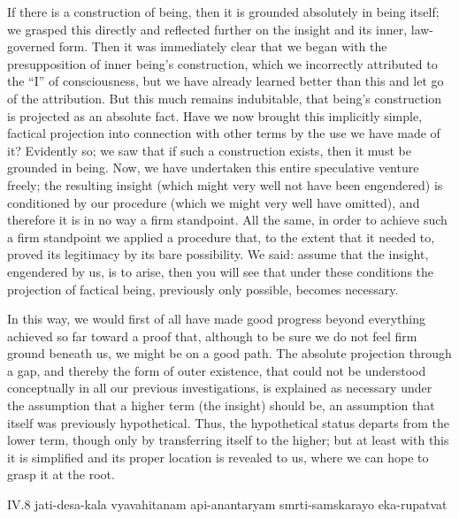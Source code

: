 If there is a construction of being,
then it is grounded absolutely in being itself;
we grasped this directly and reflected further on the
insight and its inner, law-governed form.
Then it was immediately clear that
we began with the presupposition of inner being's construction,
which we incorrectly attributed to the “I” of consciousness,
but we have already learned better than this
and let go of the attribution.
But this much remains indubitable,
that being's construction is projected as an absolute fact.
Have we now brought this implicitly simple, factical projection
into connection with other terms by the use we have made of it?
Evidently so; we saw that if such a construction exists,
then it must be grounded in being.
Now, we have undertaken this entire speculative venture freely;
the resulting insight
(which might very well not have been engendered)
is conditioned by our procedure
(which we might very well have omitted),
and therefore it is in no way a firm standpoint.
All the same, in order to achieve such a firm standpoint
we applied a procedure that, to the extent that it needed to,
proved its legitimacy by its bare possibility.
We said: assume that the insight, engendered by us,
is to arise, then you will see that under these conditions
the projection of factical being, previously only possible,
becomes necessary.

In this way, we would first of all have made
good progress beyond everything achieved so far
toward a proof that, although to be sure
we do not feel firm ground beneath us,
we might be on a good path.
The absolute projection through a gap,
and thereby the form of outer existence,
that could not be understood conceptually
in all our previous investigations,
is explained as necessary
under the assumption that
a higher term (the insight) should be,
an assumption that itself was previously hypothetical.
Thus, the hypothetical status departs from the lower term,
though only by transferring itself to the higher;
but at least with this it is simplified
and its proper location is revealed to us,
where we can hope to grasp it at the root.

IV.8
jati-desa-kala vyavahitanam api-anantaryam smrti-samskarayo eka-rupatvat

